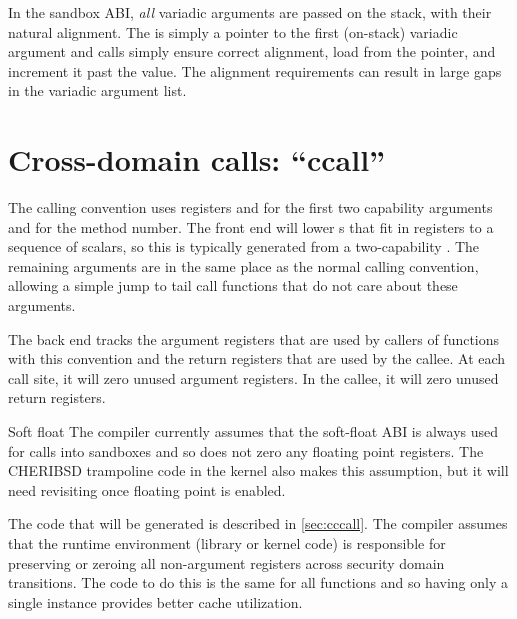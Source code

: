In the sandbox ABI, \textit{all} variadic arguments are passed on the stack, with their natural alignment.
The  is simply a pointer to the first (on-stack) variadic argument and  calls simply ensure correct alignment, load from the pointer, and increment it past the value.
The alignment requirements can result in large gaps in the variadic argument list.


\section{Cross-domain calls: ``ccall''}

The  calling convention uses registers  and  for the first two capability arguments and  for the method number.
The front end will lower s that fit in registers to a sequence of scalars, so this is typically generated from a two-capability .
The remaining arguments are in the same place as the normal calling convention, allowing a simple jump to tail call functions that do not care about these arguments.

The back end tracks the argument registers that are used by callers of functions with this convention and the return registers that are used by the callee.
At each call site, it will zero unused argument registers.
In the callee, it will zero unused return registers.

\begin{notebox}{Soft float}
	The compiler currently assumes that the soft-float ABI is always used for calls into sandboxes and so does not zero any floating point registers.
	The CHERIBSD trampoline code in the kernel also makes this assumption, but it will need revisiting once floating point is enabled.
\end{notebox}

The code that will be generated is described in \autoref{sec:cccall}.
The compiler assumes that the runtime environment (library or kernel code) is responsible for preserving or zeroing all non-argument registers across security domain transitions.
The code to do this is the same for all functions and so having only a single instance provides better cache utilization.

